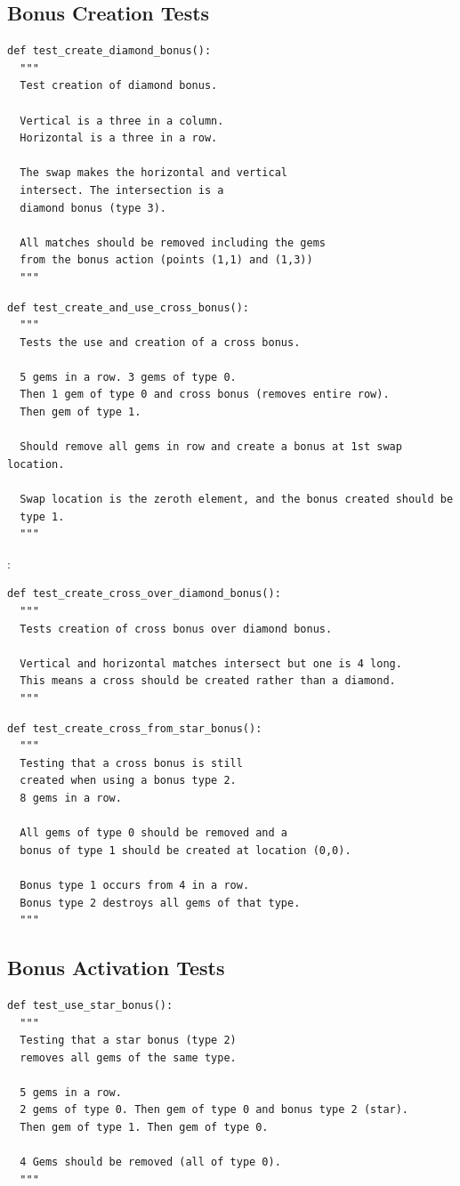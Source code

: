 \documentclass{bhamthesis}
\theoremstyle{definition}
\begin{document}
\subsection{Bonus Creation Tests}


\begin{verbatim}
def test_create_diamond_bonus():
  """
  Test creation of diamond bonus.

  Vertical is a three in a column.
  Horizontal is a three in a row.

  The swap makes the horizontal and vertical
  intersect. The intersection is a
  diamond bonus (type 3).

  All matches should be removed including the gems
  from the bonus action (points (1,1) and (1,3))
  """
\end{verbatim}


\begin{verbatim}
def test_create_and_use_cross_bonus():
  """
  Tests the use and creation of a cross bonus.

  5 gems in a row. 3 gems of type 0.
  Then 1 gem of type 0 and cross bonus (removes entire row).
  Then gem of type 1.

  Should remove all gems in row and create a bonus at 1st swap location.

  Swap location is the zeroth element, and the bonus created should be
  type 1.
  """
\end{verbatim}:

\begin{verbatim}
def test_create_cross_over_diamond_bonus():
  """
  Tests creation of cross bonus over diamond bonus.

  Vertical and horizontal matches intersect but one is 4 long.
  This means a cross should be created rather than a diamond.
  """
\end{verbatim}



\begin{verbatim}
def test_create_cross_from_star_bonus():
  """
  Testing that a cross bonus is still
  created when using a bonus type 2.
  8 gems in a row.

  All gems of type 0 should be removed and a
  bonus of type 1 should be created at location (0,0).

  Bonus type 1 occurs from 4 in a row.
  Bonus type 2 destroys all gems of that type.
  """
\end{verbatim}

\subsection{Bonus Activation Tests}
\begin{verbatim}
def test_use_star_bonus():
  """
  Testing that a star bonus (type 2)
  removes all gems of the same type.

  5 gems in a row.
  2 gems of type 0. Then gem of type 0 and bonus type 2 (star).
  Then gem of type 1. Then gem of type 0.

  4 Gems should be removed (all of type 0).
  """
\end{verbatim}
\end{document}
